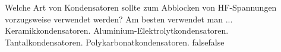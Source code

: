     {Welche Art von Kondensatoren sollte zum Abblocken von HF-Spannungen vorzugsweise verwendet werden? Am besten verwendet man ...}
    {Keramikkondensatoren.}
    {Aluminium-Elektrolytkondensatoren.}
    {Tantalkondensatoren.}
    {Polykarbonatkondensatoren.}
    {false}{false}